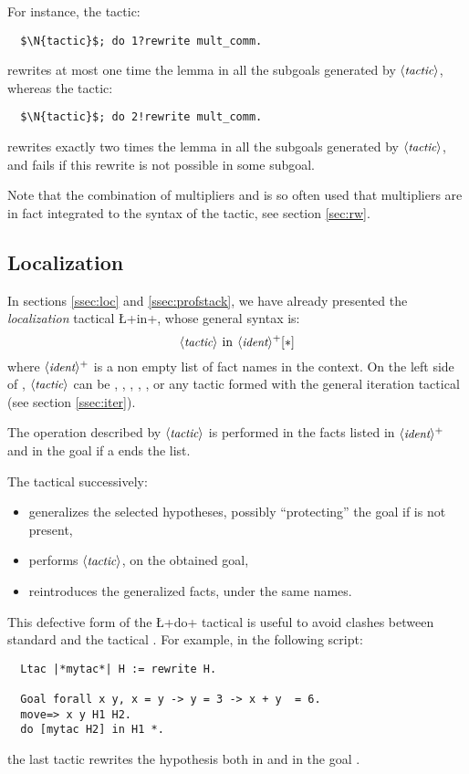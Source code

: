 For instance, the tactic:
\begin{lstlisting}
  $\N{tactic}$; do 1?rewrite mult_comm.
\end{lstlisting}
rewrites at most one time the lemma  in all the subgoals
generated by $\langle\mbox{\itshape\rmfamily\small tactic}\rangle$, whereas the tactic:
\begin{lstlisting}
  $\N{tactic}$; do 2!rewrite mult_comm.
\end{lstlisting}
rewrites exactly two times the lemma  in all the subgoals
generated by $\langle\mbox{\itshape\rmfamily\small tactic}\rangle$, and fails if this rewrite is not possible
in some subgoal.

Note that the combination of multipliers and  is so often
used that multipliers are in fact integrated to the syntax of the \ssr{}
 tactic, see section \ref{sec:rw}.

\subsection{Localization}\label{ssec:gloc}

In sections \ref{ssec:loc} and \ref{ssec:profstack}, we have already
presented the \emph{localization} tactical \L+in+, whose general
syntax is:
$$\N{tactic}\ \C{in}\ \N{ident}^+ [\C{*}]$$
where $\langle\mbox{\itshape\rmfamily\small ident}\rangle^+$ is a non empty list of fact
names in the context. On the left side of , $\langle\mbox{\itshape\rmfamily\small tactic}\rangle$ can be
, , , , ,
 or any tactic formed with the general iteration tactical  (see
 section \ref{ssec:iter}).

The operation described by $\langle\mbox{\itshape\rmfamily\small tactic}\rangle$ is performed in the facts
listed in $\langle\mbox{\itshape\rmfamily\small ident}\rangle^+$ and in the goal if a \C{*} ends
the list.

The  tactical successively:
\begin{itemize}
\item generalizes the selected hypotheses, possibly ``protecting'' the
 goal if \C{*} is not present,
\item performs $\langle\mbox{\itshape\rmfamily\small tactic}\rangle$, on the obtained goal,
\item reintroduces the generalized facts, under the same names.
\end{itemize}

This defective form of the \L+do+ tactical is useful to avoid clashes
between standard \Ltac{}  and the \ssr{} tactical .
For example, in the following script:
\begin{lstlisting}
  Ltac |*mytac*| H := rewrite H.

  Goal forall x y, x = y -> y = 3 -> x + y  = 6.
  move=> x y H1 H2.
  do [mytac H2] in H1 *.
\end{lstlisting}
the last tactic rewrites the hypothesis  both in
 and in the goal .

